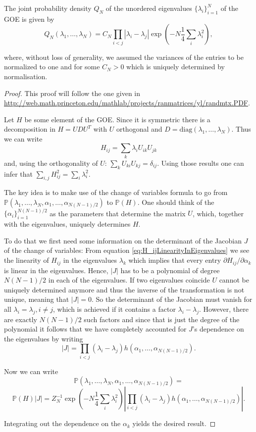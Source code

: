 \begin{theorem}
	The joint probability density $Q_N$ of the unordered eigenvalues $\{\lambda_i\}_{i=1}^N$ of the GOE is given by
	$$Q_N(\lambda_1,\dots,\lambda_N) = C_N\prod_{i<j}|\lambda_i-\lambda_j|\exp\left(-N\frac{1}{4}\sum_i \lambda_i^2\right),$$
	
	where, without loss of generality, we assumed the variances of the entries to be normalized to one and for some $C_N>0$ which is uniquely determined by normalisation.
	
\end{theorem}
\begin{proof}
	This proof will follow the one given in \url{http://web.math.princeton.edu/mathlab/projects/ranmatrices/yl/randmtx.PDF}.
	
	Let $H$ be some element of the GOE. Since it is symmetric there is a decomposition in $H=UDU^T$ with $U$ orthogonal and $D=\text{diag}(\lambda_1,\dots,\lambda_N)$. Thus we can write 
	\begin{equation}\label{eq:H_ijLinearityInEigenvalues}
		H_{ij} = \sum_k \lambda_i U_{ik}U_{jk}
	\end{equation}	
	and, using the orthogonality of $U$: $\sum_k U_{ki}U_{kj}=\delta_{ij}$. Using those results one can infer that $\sum_{i,j}H_{ij}^2=\sum_i \lambda_i^2$.
	
	The key idea is to make use of the change of variables formula to go from $\mathbb P(\lambda_1,\dots,\lambda_N,\alpha_1,\dots,\alpha_{N(N-1)/2})$ to $\mathbb P(H)$. One should think of the $\{\alpha_i\}_{i=1}^{N(N-1)/2}$ as the parameters that determine the matrix $U$, which, together with the eigenvalues, uniquely determines $H$.
	
	To do that we first need some information on the determinant of the Jacobian $J$ of the change of variables:
	From equation \ref{eq:H_ijLinearityInEigenvalues} we see the linearity of $H_{ij}$ in the eigenvalues $\lambda_k$ which implies that every entry $\partial H_{ij}/\partial\alpha_k$ is linear in the eigenvalues. Hence, $|J|$ has to be a polynomial of degree $N(N-1)/2$ in each of the eigenvalues. If two eigenvalues coincide $U$ cannot be uniquely determined anymore and thus the inverse of the transformation is not unique, meaning that $|J|=0$. So the determinant of the Jacobian must vanish for all $\lambda_i=\lambda_j, i\neq j$, which is achieved if it contains a factor $\lambda_i-\lambda_j$. However, there are exactly $N(N-1)/2$ such factors and since that is just the degree of the polynomial it follows that we have completely accounted for $J$'s dependence on the eigenvalues by writing $$|J|=\prod_{i<j}(\lambda_i-\lambda_j) h(\alpha_1,\dots,\alpha_{N(N-1)/2}).$$
	
	Now we can write
	$$\mathbb P(\lambda_1,\dots,\lambda_N,\alpha_1,\dots,\alpha_{N(N-1)/2}) = $$
	$$\mathbb P(H)|J|=Z_N^{-1}\exp\left(-N\frac{1}{4}\sum_i\lambda_i^2\right)|\prod_{i<j}(\lambda_i-\lambda_j) h(\alpha_1,\dots,\alpha_{N(N-1)/2})|.$$
	
	Integrating out the dependence on the $\alpha_k$ yields the desired result.
\end{proof}

